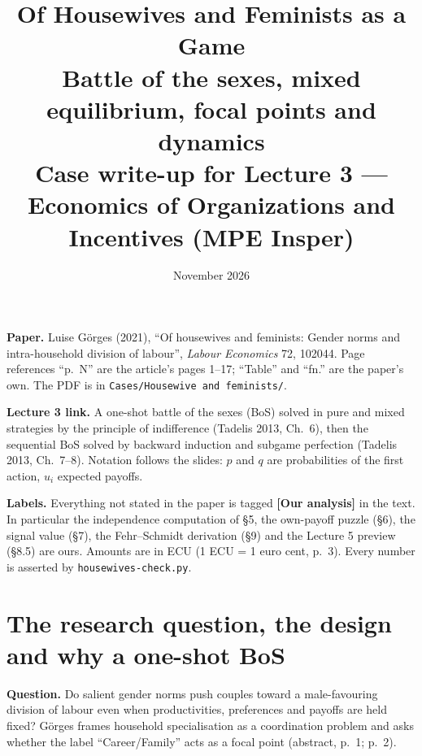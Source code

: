 \documentclass[11pt,a4paper]{article}
\title{\textbf{Of Housewives and Feminists as a Game}\\[4pt]
  \large Battle of the sexes, mixed equilibrium, focal points and dynamics\\[2pt]
  \normalsize Case write-up for Lecture 3 --- Economics of Organizations and Incentives (MPE Insper)}
\date{November 2026}
\newcommand{\ours}{\textcolor{warn}{\textbf{[Our analysis]}}}
\begin{document}
\maketitle
\thispagestyle{empty}

\begin{tcolorbox}[colback=src!4,colframe=src,boxrule=0.5pt,title={The case and how to read this write-up}]
\textbf{Paper.} Luise G\"orges (2021), ``Of housewives and feminists: Gender norms and
intra-household division of labour'', \emph{Labour Economics} 72, 102044. Page references
``p.~N'' are the article's pages 1--17; ``Table'' and ``fn.'' are the paper's own. The PDF is in
\texttt{Cases/Housewive and feminists/}.

\textbf{Lecture 3 link.} A one-shot battle of the sexes (BoS) solved in pure and mixed strategies
by the principle of indifference (Tadelis 2013, Ch.~6), then the sequential BoS solved by backward
induction and subgame perfection (Tadelis 2013, Ch.~7--8). Notation follows the slides: $p$ and $q$
are probabilities of the first action, $u_i$ expected payoffs.

\textbf{Labels.} Everything not stated in the paper is tagged \ours{} in the text. In particular the
independence computation of \S5, the own-payoff puzzle (\S6), the signal value (\S7), the
Fehr--Schmidt derivation (\S9) and the Lecture 5 preview (\S8.5) are ours. Amounts are in ECU
(1 ECU = 1 euro cent, p.~3). Every number is asserted by \texttt{housewives-check.py}.
\end{tcolorbox}

\section{The research question, the design and why a one-shot BoS}

\textbf{Question.} Do salient gender norms push couples toward a male-favouring division of
labour even when productivities, preferences and payoffs are held fixed? G\"orges frames
household specialisation as a coordination problem and asks whether the label ``Career/Family''
acts as a focal point (abstract, p.~1; p.~2).
\end{document}
